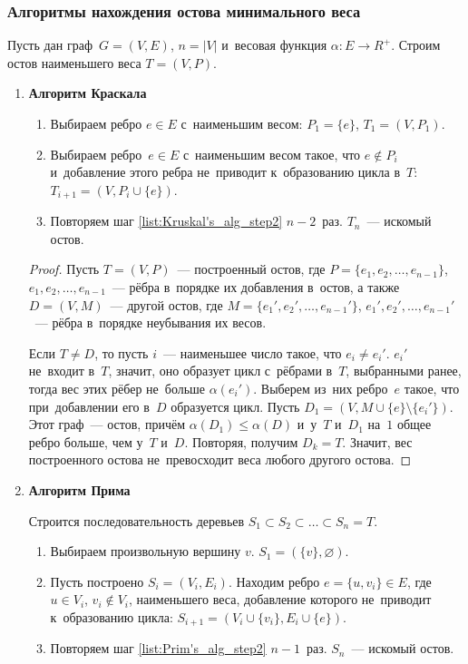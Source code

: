 \subsubsection{Алгоритмы нахождения остова минимального веса}
Пусть дан граф~$G = (V, E)$, $n = |V|$ и~весовая функция $\alpha \colon E \to R^+$.
Строим остов наименьшего веса $T = (V, P)$.
\begin{enumerate}
	\item\textbf{Алгоритм Краскала}
	\begin{enumerate}
		\item Выбираем ребро $e \in E$ с~наименьшим весом: $P_1 = \{ e \}$, $T_1 = (V, P_1)$.
		\item\label{list:Kruskal's_alg_step2} Выбираем ребро~$e \in E$ с~наименьшим весом такое, что $e \notin P_i$ и~добавление этого ребра не~приводит к~образованию цикла в~$T$: $T_{i+1} = (V, P_i \cup \{ e \})$.
		\item Повторяем шаг \ref{list:Kruskal's_alg_step2} $n - 2$~раз.
		$T_n$~--- искомый остов.
	\end{enumerate}
	\begin{proof}
		Пусть $T = (V, P)$~--- построенный остов, где $P = \{ e_1, e_2, \ldots, e_{n-1} \}$, $e_1, e_2, \ldots, \allowbreak e_{n-1}$~--- рёбра в~порядке их добавления в~остов, а также $D = (V, M)$~--- другой остов, где $M = \{ e_1', e_2', \ldots, \allowbreak e_{n-1}' \}$, $e_1', e_2', \ldots, \allowbreak e_{n-1}'$~--- рёбра в~порядке неубывания их весов.
		
		Если $T \neq D$, то пусть $i$~--- наименьшее число такое, что $e_i \neq e_i'$.
		$e_i'$ не~входит в~$T$, значит, оно образует цикл с~рёбрами в~$T$, выбранными ранее, тогда вес этих рёбер не~больше $\alpha(e_i')$.
		Выберем из~них ребро~$e$ такое, что при~добавлении его в~$D$ образуется цикл.
		Пусть $D_1 = (V, M \cup \{ e \} \setminus \{ e_i' \})$.
		Этот граф~--- остов, причём $\alpha(D_1) \leqslant \alpha(D)$ и~у~$T$ и~$D_1$ на~$1$ общее ребро больше, чем у~$T$ и~$D$.
		Повторяя, получим $D_k = T$.
		Значит, вес построенного остова не~превосходит веса любого другого остова.
	\end{proof}

	\item\textbf{Алгоритм Прима}
	
	Строится последовательность деревьев $S_1 \subset S_2 \subset \ldots \subset S_n = T$.
	\begin{enumerate}
		\item Выбираем произвольную вершину $v$. $S_1 = (\{ v \}, \varnothing)$.
		\item\label{list:Prim's_alg_step2} Пусть построено $S_i = (V_i, E_i)$.
		Находим ребро $e = \{ u, v_i \} \in E$, где $u \in V_i$, $v_i \notin V_i$, наименьшего веса, добавление которого не~приводит к~образованию цикла: $S_{i+1} = (V_i \cup \{ v_i \}, E_i \cup \{ e \})$.
		\item Повторяем шаг \ref{list:Prim's_alg_step2} $n - 1$~раз.
		$S_n$~--- искомый остов.
	\end{enumerate}
\end{enumerate}